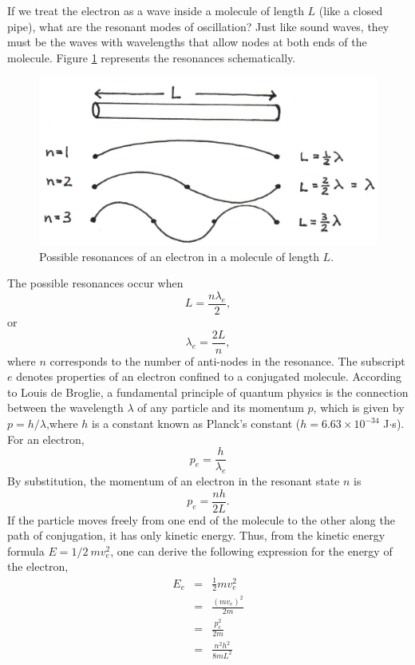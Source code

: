 If we treat the electron as a wave inside a molecule of length $L$ (like a closed pipe), what are the resonant modes of oscillation?  Just like sound waves, they must be the waves with wavelengths that allow nodes at both ends of the molecule.  Figure \ref{Fig6-2} represents the resonances schematically.
\begin{figure}[h]
	\centering
	\includegraphics[width=\textwidth]{./figures/Topic6/Fig6-2.jpg}
	\caption{Possible resonances of an electron in a molecule of length $L$.}
	\label{Fig6-2}
\end{figure}

The possible resonances occur when
$$L=\frac{n\lambda_e}{2},$$
or
\begin{equation}\label{eqn6-1}
\lambda_e=\frac{2L}{n},
\end{equation}
where $n$ corresponds to the number of anti-nodes in the resonance. The subscript $e$ denotes properties of an electron confined to a conjugated molecule. According to Louis de Broglie, a fundamental principle of quantum physics is the connection between the wavelength $\lambda$ of any particle and its momentum $p$, which is given by $p=h/\lambda$,where $h$ is a constant known as Planck’s constant ($h = 6.63\times10^{-34}$ J$\cdot$s). For an electron,
\begin{equation}\label{eqn6-2}
p_e=\frac{h}{\lambda_e}
\end{equation}
By substitution, the momentum of an electron in the resonant state $n$ is
\begin{equation}\label{eqn6-3}
p_e=\frac{nh}{2L}.
\end{equation}
If the particle moves freely from one end of the molecule to the other along the path of conjugation, it has only kinetic energy.  Thus, from the kinetic energy formula $E=1/2~mv_e^2$, one can derive the following expression for the energy of the electron,                                                                                                                                            
\begin{eqnarray}\label{eqn6-4}
E_e&=&\frac{1}{2}mv_e^2\nonumber\\
			&=&\frac{\left(mv_e\right)^2}{2m}\nonumber\\
			&=&\frac{p_e^2}{2m}\nonumber\\
			&=&\frac{n^2h^2}{8mL^2}
\end{eqnarray}

